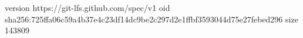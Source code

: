 version https://git-lfs.github.com/spec/v1
oid sha256:725ffa06c59a4b37e4c23df14dc9be2c297d2e1ffbf3593044d75e27febed296
size 143809
